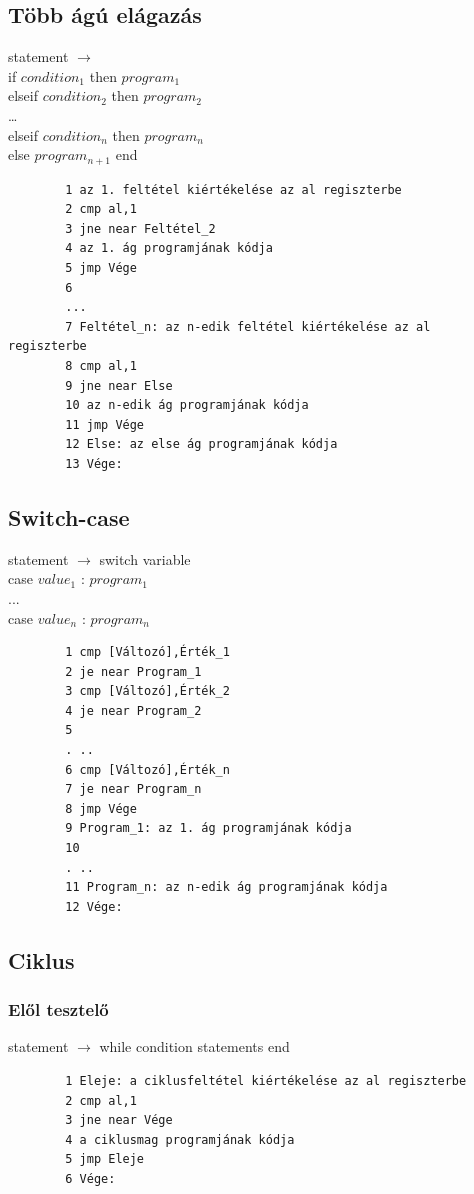 \documentclass[margin=0px]{article}
\begin{document}
\subsection{Több ágú elágazás}


statement $ \rightarrow $
\\if $ condition_1 $ then $ program_1 $
\\elseif $ condition_2 $ then $ program_2 $
\\\dots
\\elseif $ condition_n $ then $ program_n $
\\else $ program_{n+1} $ end

\begin{verbatim}
		1 az 1. feltétel kiértékelése az al regiszterbe
		2 cmp al,1
		3 jne near Feltétel_2
		4 az 1. ág programjának kódja
		5 jmp Vége
		6
		...
		7 Feltétel_n: az n-edik feltétel kiértékelése az al regiszterbe
		8 cmp al,1
		9 jne near Else
		10 az n-edik ág programjának kódja
		11 jmp Vége
		12 Else: az else ág programjának kódja
		13 Vége:
	\end{verbatim}

\subsection{Switch-case}
statement $ \rightarrow $ switch variable
\\case $ value_1 $ : $ program_1 $
\\...
\\case $ value_n $ : $ program_n $

\begin{verbatim}
		1 cmp [Változó],Érték_1
		2 je near Program_1
		3 cmp [Változó],Érték_2
		4 je near Program_2
		5
		. ..
		6 cmp [Változó],Érték_n
		7 je near Program_n
		8 jmp Vége
		9 Program_1: az 1. ág programjának kódja
		10
		. ..
		11 Program_n: az n-edik ág programjának kódja
		12 Vége:
	\end{verbatim}

\subsection{Ciklus}
\subsubsection{Elől tesztelő}
statement $ \rightarrow $ while condition statements end

\begin{verbatim}
		1 Eleje: a ciklusfeltétel kiértékelése az al regiszterbe
		2 cmp al,1
		3 jne near Vége
		4 a ciklusmag programjának kódja
		5 jmp Eleje
		6 Vége:
	\end{verbatim}
\end{document}
